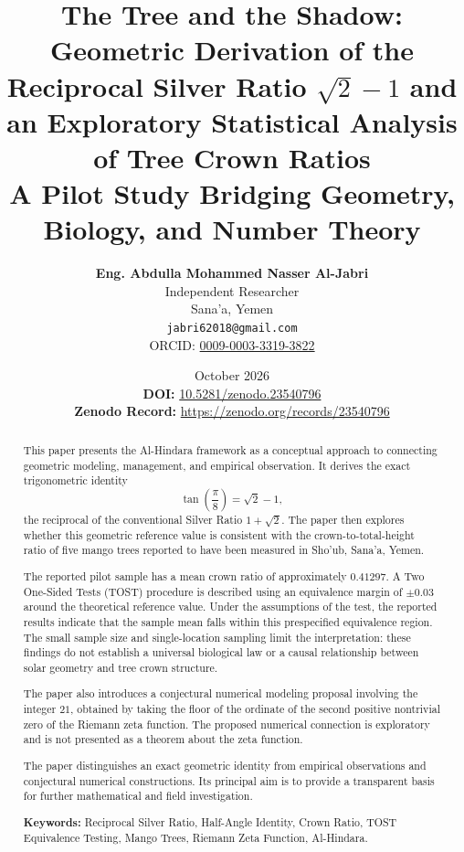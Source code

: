 \documentclass[11pt,a4paper]{article}
\title{
    \textbf{The Tree and the Shadow:}\\
    \Large Geometric Derivation of the Reciprocal Silver Ratio
    \(\sqrt{2}-1\) and an Exploratory Statistical Analysis
    of Tree Crown Ratios\\[0.5em]
    \large A Pilot Study Bridging Geometry, Biology,
    and Number Theory
}
\author{
    \textbf{Eng. Abdulla Mohammed Nasser Al-Jabri}\\
    \small Independent Researcher\\
    \small Sana'a, Yemen\\
    \small\texttt{jabri62018@gmail.com}\\
    \small ORCID:
    \href{https://orcid.org/0009-0003-3319-3822}
    {0009-0003-3319-3822}
}
\date{
October 2026 \\[1em]
\small \textbf{DOI:} \href{https://doi.org/10.5281/zenodo.23540796}{10.5281/zenodo.23540796} \\
\small \textbf{Zenodo Record:} \url{https://zenodo.org/records/23540796}
}
\begin{document}
\maketitle
\thispagestyle{fancy}

\begin{abstract}
\noindent
This paper presents the Al-Hindara framework as a conceptual
approach to connecting geometric modeling, management, and
empirical observation. It derives the exact trigonometric identity
\[
    \tan\left(\frac{\pi}{8}\right)=\sqrt{2}-1,
\]
the reciprocal of the conventional Silver Ratio
\(1+\sqrt{2}\). The paper then explores whether this geometric
reference value is consistent with the crown-to-total-height
ratio of five mango trees reported to have been measured in
Sho'ub, Sana'a, Yemen.

The reported pilot sample has a mean crown ratio of approximately
\(0.41297\). A Two One-Sided Tests (TOST) procedure is described
using an equivalence margin of \(\pm 0.03\) around the theoretical
reference value. Under the assumptions of the test, the reported
results indicate that the sample mean falls within this
prespecified equivalence region. The small sample size and
single-location sampling limit the interpretation: these findings
do not establish a universal biological law or a causal
relationship between solar geometry and tree crown structure.

The paper also introduces a conjectural numerical modeling
proposal involving the integer \(21\), obtained by taking the floor
of the ordinate of the second positive nontrivial zero of the
Riemann zeta function. The proposed numerical connection is
exploratory and is not presented as a theorem about the zeta
function.

The paper distinguishes an exact geometric identity from
empirical observations and conjectural numerical constructions.
Its principal aim is to provide a transparent basis for further
mathematical and field investigation.

\vspace{1em}
\noindent\textbf{Keywords:}
Reciprocal Silver Ratio, Half-Angle Identity, Crown Ratio,
TOST Equivalence Testing, Mango Trees, Riemann Zeta Function,
Al-Hindara.
\end{abstract}

\end{document}
